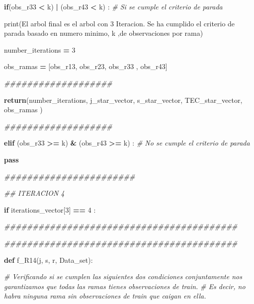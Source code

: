 \documentclass[
  11pt,
  a4paper,
]{article}
\newenvironment{Shaded}{\begin{snugshade}}{\end{snugshade}}
\newcommand{\BuiltInTok}[1]{#1}
\newcommand{\CommentTok}[1]{\textcolor[rgb]{0.56,0.35,0.01}{\textit{#1}}}
\newcommand{\ControlFlowTok}[1]{\textcolor[rgb]{0.13,0.29,0.53}{\textbf{#1}}}
\newcommand{\DecValTok}[1]{\textcolor[rgb]{0.00,0.00,0.81}{#1}}
\newcommand{\KeywordTok}[1]{\textcolor[rgb]{0.13,0.29,0.53}{\textbf{#1}}}
\newcommand{\NormalTok}[1]{#1}
\newcommand{\OperatorTok}[1]{\textcolor[rgb]{0.81,0.36,0.00}{\textbf{#1}}}
\newcommand{\StringTok}[1]{\textcolor[rgb]{0.31,0.60,0.02}{#1}}
\begin{document}
\begin{Shaded}
\begin{Highlighting}[]
        \ControlFlowTok{if}\NormalTok{(obs\_r33 }\OperatorTok{\textless{}}\NormalTok{ k) }\OperatorTok{|}\NormalTok{ (obs\_r43 }\OperatorTok{\textless{}}\NormalTok{ k) : }\CommentTok{\# Si se cumple el criterio de parada}


            \BuiltInTok{print}\NormalTok{(}\StringTok{\textquotesingle{}El arbol final es el arbol con 3 Iteracion. Se ha cumplido el criterio de parada basado en numero minimo\textquotesingle{}}\NormalTok{, k ,}\StringTok{\textquotesingle{}de observaciones por rama\textquotesingle{}}\NormalTok{)}

\NormalTok{            number\_iterations }\OperatorTok{=} \DecValTok{3}
            
\NormalTok{            obs\_ramas }\OperatorTok{=}\NormalTok{ [obs\_r13, obs\_r23, obs\_r33 , obs\_r43]}

            
            \CommentTok{\#\#\#\#\#\#\#\#\#\#\#\#\#\#\#\#\#\#\#}
            
            \ControlFlowTok{return}\NormalTok{(number\_iterations, j\_star\_vector, s\_star\_vector, TEC\_star\_vector, obs\_ramas ) }

            \CommentTok{\#\#\#\#\#\#\#\#\#\#\#\#\#\#\#\#\#\#\#}


        \ControlFlowTok{elif}\NormalTok{ (obs\_r33 }\OperatorTok{\textgreater{}=}\NormalTok{ k) }\OperatorTok{\&}\NormalTok{ (obs\_r43 }\OperatorTok{\textgreater{}=}\NormalTok{ k) : }\CommentTok{\# No se cumple el criterio de parada}

            \ControlFlowTok{pass}

    \CommentTok{\#\#\#\#\#\#\#\#\#\#\#\#\#\#\#\#\#\#\#\#\#\#\#}


    \CommentTok{\#\# ITERACION 4}

    \ControlFlowTok{if}\NormalTok{ iterations\_vector[}\DecValTok{3}\NormalTok{] }\OperatorTok{==} \DecValTok{4}\NormalTok{ :  }

       \CommentTok{\#\#\#\#\#\#\#\#\#\#\#\#\#\#\#\#\#\#\#\#\#\#\#\#\#\#\#\#\#\#\#\#\#\#\#\#\#\#\#\#\#}

       \CommentTok{\#\#\#\#\#\#\#\#\#\#\#\#\#\#\#\#\#\#\#\#\#\#\#\#\#\#\#\#\#\#\#\#\#\#\#\#\#\#\#\#\#}

        \KeywordTok{def}\NormalTok{ f\_R14(j, s, r, Data\_set):}

           \CommentTok{\# Verificando si se cumplen las siguientes dos condiciones conjuntamente nos garantizamos que todas las ramas tienes observaciones de train. }
           \CommentTok{\# Es decir, no habra ninguna rama sin observaciones de train que caigan en ella.}


\end{Highlighting}
\end{Shaded}
\end{document}
